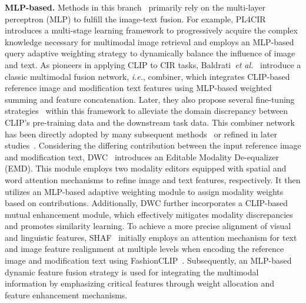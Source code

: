 \textbf{MLP-based.} Methods in this branch~\cite{anwaar2021ComposeAE,baldrati2022Combiner,baldrati2022CLIP4CIR,zhao2022PL4CIR,baldrati2023CLIP4CIR2,li2023dscn,lin2023clip_cd,liu2024blip4cir,wan2024caff,li2023manme,zhang2024cssnet,yan2024shaf,li2024clip,wen2024dqu,wang2024sadn,wang2024NSFSE,delmas2022artemis,li2024cmap,dmot} primarily rely on the multi-layer perceptron (MLP) to fulfill the image-text fusion. For example, PL4CIR~\cite{zhao2022PL4CIR} introduces a multi-stage learning framework to progressively acquire the complex knowledge necessary for multimodal image retrieval and employs an MLP-based query adaptive weighting strategy to dynamically balance the influence of image and text. 
As pioneers in applying CLIP to CIR tasks, Baldrati~\textit{et al.}~\cite{baldrati2022Combiner} introduce a classic multimodal fusion network, \textit{i.e.}, combiner, which integrates CLIP-based reference image and modification text features using MLP-based weighted summing and feature concatenation. Later, they also propose several fine-tuning strategies~\cite{baldrati2022CLIP4CIR, baldrati2023CLIP4CIR2} within this framework to alleviate the domain discrepancy between CLIP's pre-training data and the downstream task data. This combiner network has been directly adopted by many subsequent methods~\cite{liu2024blip4cir, wen2024dqu, wang2024sadn} or refined in later studies~\cite{lin2023clip_cd,wan2024caff}. 
Considering the differing contribution between the input reference image and modification text, DWC~\cite{huang2024dwc} introduces an Editable Modality De-equalizer (EMD). This module employs two modality editors equipped with spatial and word attention mechanisms to refine image and text features, respectively. It then utilizes an MLP-based adaptive weighting module to assign modality weights based on contributions. Additionally, DWC further incorporates a CLIP-based mutual enhancement module, which effectively mitigates modality discrepancies and promotes similarity learning. To achieve a more precise alignment of visual and linguistic features, SHAF~\cite{yan2024shaf} initially employs an attention mechanism for text and image feature realignment at multiple levels when encoding the reference image and modification text using FashionCLIP~\cite{chia2022contrastive}. Subsequently, an MLP-based dynamic feature fusion strategy is used for integrating the multimodal information by emphasizing critical features through weight allocation and feature enhancement mechanisms. 

